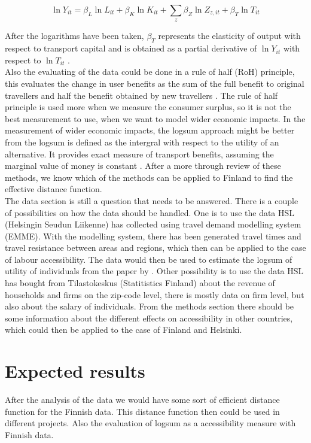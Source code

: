 \documentclass[a4paper, 12 pt]{article}   	%
\begin{document}
\begin{equation}
\ln Y_{it} = \beta_L \ln L_{it} + \beta_K \ln K_{it} + \sum_z \beta_Z \ln Z_{z, it} + \beta_T \ln T_{it}
\end{equation}

After the logarithms have been taken, $\beta_T$ represents the elasticity of output with respect to transport capital and is obtained as a partial derivative of $\ln Y_{it}$ with respect to $\ln T_{it}$ \citep{melo}. \\

Also the evaluating of the data could be done in a rule of half (RoH) principle, this evaluates the change in user benefits as the sum of the full benefit to original travellers and half the benefit obtained by new travellers \citep{geurs}. The rule of half principle is used more when we measure the consumer surplus, so it is not the best measurement to use, when we want to model wider economic impacts. In the measurement of wider economic impacts, the logsum approach might be better from \cite{geurs} the logsum is defined as the intergral with respect to the utility of an alternative. It provides exact measure of transport benefits, assuming the marginal value of money is constant  \citep{geurs}. After a more through review of these methods, we know which of the methods can be applied to Finland to find the effective distance function.\\
	
The data section is still a question that needs to be answered. There is a couple of possibilities on how the data should be handled. One is to use the data HSL (Helsingin Seudun Liikenne) has collected using travel demand modelling system (EMME). With the modelling system, there has been generated travel times and travel resistance between areas and regions, which then can be applied to the case of labour accessibility. The data would then be used to estimate the logsum of utility of individuals from the paper by \citep[p.~387]{geurs}. Other possibility is to use the data HSL has bought from Tilastokeskus (Statitistics Finland) about the revenue of households and firms on the zip-code level, there is mostly data on firm level, but also about the salary of individuals. From the methods section there should be some information about the different effects on accessibility in other countries, which could then be applied to the case of Finland and Helsinki.\\

\section{Expected results}

After the analysis of the data we would have some sort of efficient distance function for the Finnish data. This distance function then could be used in different projects. Also the evaluation of logsum as a accessibility measure with Finnish data.  \\



\end{document}
